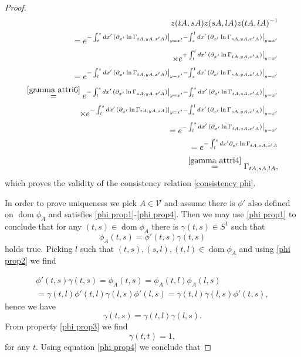 \documentclass[b5paper,draft,openbib,12pt]{memoir}
\DeclareMathOperator{\dom}{dom}
\begin{document}
\begin{proof}
\begin{align}
z(tA,sA) z(sA,lA)z(tA,lA)^{-1}\\
=e^{-\int_t^s d x' \left.(\partial_{x'} \ln \Gamma_{tA,yA,x'A} )\right|_{y=x'} -\int_s^l d x' \left.(\partial_{x'} \ln \Gamma_{sA,yA,x'A} )\right|_{y=x'} }\\
\times e^{   +\int_t^l d x' \left.(\partial_{x'} \ln \Gamma_{tA,yA,x'A} )\right|_{y=x'}  }\\
=e^{-\int_l^s d x' \left.(\partial_{x'} \ln \Gamma_{tA,yA,x'A} )\right|_{y=x'}  -\int_s^l d x' \left.(\partial_{x'} \ln \Gamma_{sA,yA,x'A} )\right|_{y=x'} }\\
\overset{\eqref{gamma attri6}}{=}
e^{-\int_l^s d x' \left.(\partial_{x'} \ln \Gamma_{sA,yA,x'A} )\right|_{y=x'} 
-\int_l^s d x' \left.(\partial_{x'} \ln \Gamma_{tA,sA,x'A} )\right|_{y=x'}}\\ 
\times e^{-\int_l^s d x' \left.(\partial_{x'} \ln \Gamma_{tA,yA,sA} )\right|_{y=x'} 
 -\int_s^l d x' \left.(\partial_{x'} \ln \Gamma_{sA,yA,x'A} )\right|_{y=x'} }\\
 =e^{-\int_l^s d x' \left.(\partial_{x'} \ln \Gamma_{tA,sA,x'A} )\right|_{y=x'}}\\
  =e^{-\int_l^s d x'\partial_{x'} \ln \Gamma_{tA,sA,x'A} }\\
  \overset{\eqref{gamma attri4}}{=}\Gamma_{t A, s A, l A},
\end{align}
which proves the validity of the consistency relation 
\eqref{consistency phi}.

In order to prove uniqueness we pick \(A\in \mathcal{V}\) 
and assume there is \(\phi'\) also defined on \(\dom \phi_A\) 
and satisfies \eqref{phi prop1}-\eqref{phi prop4}. Then we may 
use \eqref{phi prop1} to conclude that for any \((t,s)\in\dom\phi_A\) 
there is
\(\gamma(t,s)\in S^1\) such that
\begin{equation}
\phi_A(t,s)=\phi'(t,s) \gamma(t,s)
\end{equation}
holds true. Picking \(l\) such that \((t,s),(s,l),(t,l)\in \dom\phi_A\) and  using \eqref{phi prop2} we find

\begin{align}
\phi'(t,s) \gamma(t,s)=\phi_A(t,s)=\phi_A(t,l)\phi_A(l,s)\\
=\gamma(t,l)\phi'(t,l) \gamma(l,s)\phi'(l,s)=\gamma(t,l) \gamma(l,s)\phi'(t,s) ,
\end{align}
hence we have
\begin{equation}
 \gamma(t,s)=\gamma(t,l) \gamma(l,s).
\end{equation}
From property \eqref{phi prop3} we find
\begin{equation}
\gamma(t,t)=1,
\end{equation}
for any \(t\).
Using equation \eqref{phi prop4} we conclude that 


\end{proof}
\end{document}
